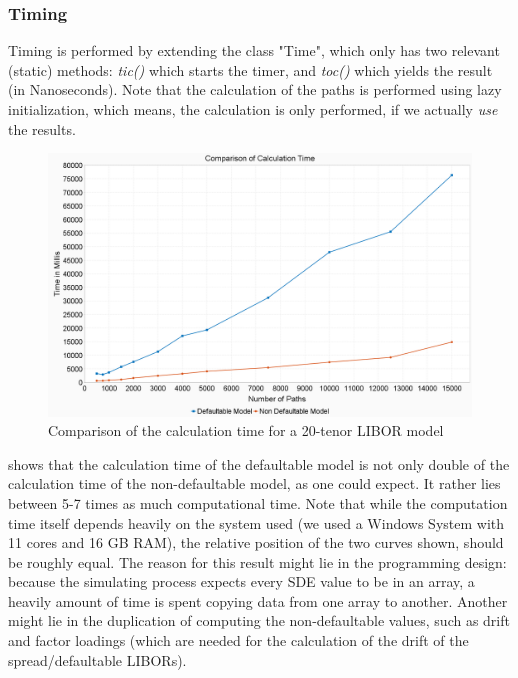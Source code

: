 \documentclass[12pt]{article}
\begin{document}
	\subsubsection{Timing}
	Timing is performed by extending the class "Time", which only has two relevant (static) methods: \emph{tic()} which starts the timer, and \emph{toc()} which yields the result (in Nanoseconds). Note that the calculation of the paths is performed using lazy initialization, which means, the calculation is only performed, if we actually \emph{use} the results. 
	\begin{figure}[h]
		\centering
		\includegraphics[width=0.7\linewidth]{figures/ComparisonOfCalcTime}
		\caption[Comparison of the calculation time for a 20-tenor LIBOR model]{Comparison of the calculation time for a 20-tenor LIBOR model}
		\label{fig:comparisonofcalctime}
	\end{figure}
	 shows that the calculation time of the defaultable model is not only double of the calculation time of the non-defaultable model, as one could expect. It rather lies between 5-7 times as much computational time. Note that while the computation time itself depends heavily on the system used (we used a Windows System with 11 cores and 16 GB RAM), the relative position of the two curves shown, should be roughly equal.
	The reason for this result might lie in the programming design: because the simulating process expects every SDE value to be in an array, a heavily amount of time is spent copying data from one array to another. Another might lie in the duplication of computing the non-defaultable values, such as drift and factor loadings (which are needed for the calculation of the drift of the spread/defaultable LIBORs).
	
\end{document}
